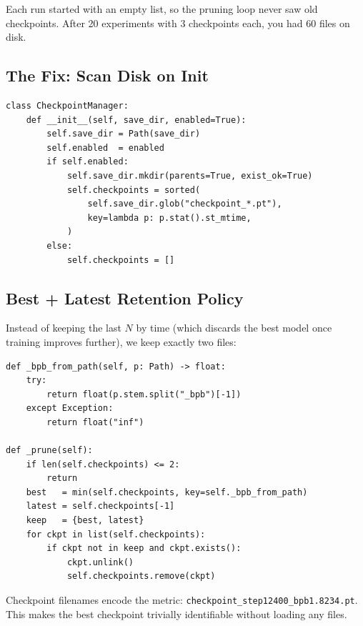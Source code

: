 \documentclass[12pt, a4paper]{article}
\newcommand{\code}[1]{\texttt{#1}}
\begin{document}
Each run started with an empty list, so the pruning loop never saw old checkpoints.
After 20 experiments with 3 checkpoints each, you had 60 files on disk.

\subsection{The Fix: Scan Disk on Init}

\begin{tcolorbox}[codebox, title=After: disk-aware initialisation]
\begin{lstlisting}[style=pythonstyle]
class CheckpointManager:
    def __init__(self, save_dir, enabled=True):
        self.save_dir = Path(save_dir)
        self.enabled  = enabled
        if self.enabled:
            self.save_dir.mkdir(parents=True, exist_ok=True)
            self.checkpoints = sorted(
                self.save_dir.glob("checkpoint_*.pt"),
                key=lambda p: p.stat().st_mtime,
            )
        else:
            self.checkpoints = []
\end{lstlisting}
\end{tcolorbox}

\subsection{Best + Latest Retention Policy}

Instead of keeping the last $N$ by time (which discards the best model once training
improves further), we keep exactly two files:

\begin{tcolorbox}[codebox, title=\_prune: keep only best + latest]
\begin{lstlisting}[style=pythonstyle]
def _bpb_from_path(self, p: Path) -> float:
    try:
        return float(p.stem.split("_bpb")[-1])
    except Exception:
        return float("inf")

def _prune(self):
    if len(self.checkpoints) <= 2:
        return
    best   = min(self.checkpoints, key=self._bpb_from_path)
    latest = self.checkpoints[-1]
    keep   = {best, latest}
    for ckpt in list(self.checkpoints):
        if ckpt not in keep and ckpt.exists():
            ckpt.unlink()
            self.checkpoints.remove(ckpt)
\end{lstlisting}
\end{tcolorbox}

Checkpoint filenames encode the metric: \code{checkpoint\_step12400\_bpb1.8234.pt}.
This makes the best checkpoint trivially identifiable without loading any files.
\end{document}

